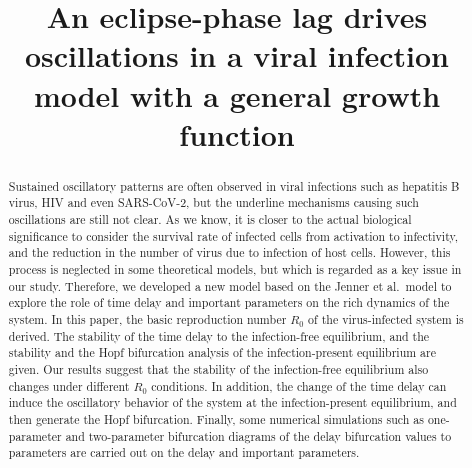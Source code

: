 \documentclass{CMHPhD-SIVD}
\providecommand{\DIFaddbegin}{} %
\providecommand{\DIFaddend}{} %
\providecommand{\DIFdelbegin}{} %
\providecommand{\DIFdelend}{} %
\begin{document}



\title{
  An eclipse-phase lag drives oscillations in a viral infection model with a general growth function}

\author{
	\DIFdelbegin %
\DIFdelend \DIFaddbegin {}
	\DIFaddend {}
}

\maketitle

\begin{abstract} %
	Sustained oscillatory patterns are often observed in viral infections such as hepatitis B virus, HIV and even SARS-CoV-2, but the underline mechanisms causing such oscillations are still not clear. As we know, it is closer to the actual biological significance to consider the survival rate of infected cells from activation to infectivity, and the reduction in the number of virus due to infection of host cells. However, this process is neglected in some theoretical models, but which is regarded as a key issue in our study. Therefore, we developed a new model based on the Jenner et al.\ model to explore the role of time delay and important parameters on the rich dynamics of the system. In this paper, the basic reproduction number $R_0$ of the virus-infected system is derived. The stability of the time delay to the infection-free equilibrium, and the stability and the Hopf bifurcation analysis of the infection-present equilibrium are given. Our results suggest that the stability of the infection-free equilibrium also changes under different $R_0$ conditions. In addition, the change of the time delay can induce the oscillatory behavior of the system at the infection-present equilibrium, and then generate the Hopf bifurcation. Finally, some numerical simulations such as one-parameter and two-parameter bifurcation diagrams of the delay bifurcation values to parameters are carried out on the delay and important parameters.
\end{abstract}
\end{document}
